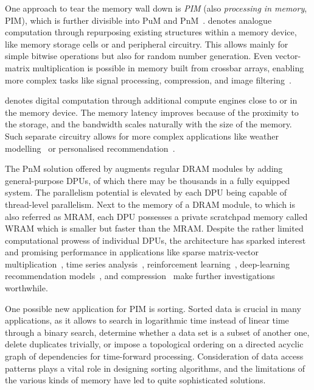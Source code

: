 One approach to tear the memory wall down is \emph{\acl{PIM}} (also \emph{processing in memory}, \acs{PIM}), which is further divisible into \acl*{PuM} and \acl*{PnM}~\cite{mutlu23memorycentric,mutlu2022Benchmarking,peccerillo2022survey}.
 denotes analogue computation through repurposing existing structures within a memory device, like memory storage cells or and peripheral circuitry.
This allows mainly for simple bitwise operations but also for random number generation.
Even vector-matrix multiplication is possible in memory built from crossbar arrays, enabling more complex tasks like signal processing, compression, and image filtering~\cite{li2017analogue}.

 denotes digital computation through additional compute engines close to or in the memory device.
The memory latency improves because of the proximity to the storage, and the bandwidth scales naturally with the size of the memory.
Such separate circuitry allows for more complex applications like weather modelling~\cite{gagandeep2020nero} or personalised recommendation~\cite{liu2020recnmp}.

The \ac{PnM} solution offered by \upmem{} augments regular \ac{DRAM} modules by adding general-purpose \acp*{DPU}, of which there may be thousands in a fully equipped system.
The parallelism potential is elevated by each \acs*{DPU} being capable of thread-level parallelism.
Next to the memory of a \acs*{DRAM} module, to which is also referred as \acf*{MRAM}, each \acs*{DPU} possesses a private scratchpad memory called \acf*{WRAM} which is smaller but faster than the \acs*{MRAM}.
Despite the rather limited computational prowess of individual \acsp*{DPU}, the architecture has sparked interest~\cite{mutlu23memorycentric,mutlu2022Benchmarking,peccerillo2022survey,hyun2024pathfinding} and promising performance in applications like sparse matrix-vector multiplication~\cite{giannoula2022sparse}, time series analysis~\cite{mutlu2022Benchmarking}, reinforcement learning~\cite{gogineni2024swiftrl}, deep-learning recommendation models~\cite{chen2024updlrm}, and compression~\cite{nider2021casestudy} make further investigations worthwhile.

One possible new application for \ac{PIM} is sorting.
Sorted data is crucial in many applications, as it allows to search in logarithmic time instead of linear time through a binary search, determine whether a data set is a subset of another one, delete duplicates trivially, or impose a topological ordering on a directed acyclic graph of dependencies for time-forward processing.
Consideration of data access patterns plays a vital role in designing sorting algorithms, and the limitations of the various kinds of memory have led to quite sophisticated solutions.

